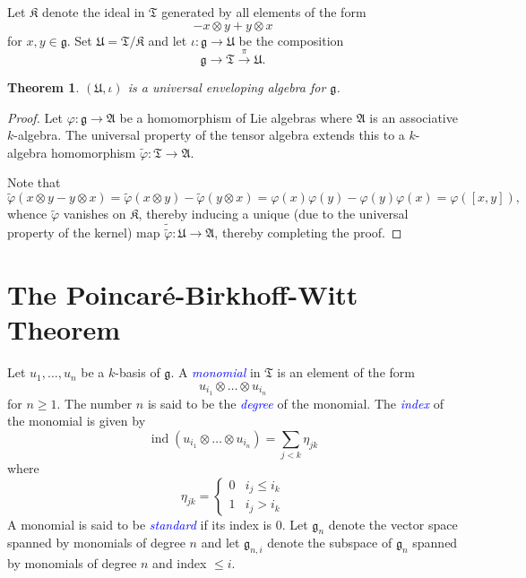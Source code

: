 \documentclass[12pt]{article}
\theoremstyle{thmstyle}
\newtheorem{theorem}{Theorem}[section]
\theoremstyle{defstyle}
\newcommand{\frakT}{\mathfrak{T}}
\newcommand{\frakg}{\mathfrak{g}}
\newcommand{\frakA}{\mathfrak{A}}
\newcommand{\frakK}{\mathfrak{K}}
\newcommand{\frakU}{\mathfrak{U}}
\newcommand{\wt}[1]{\widetilde{#1}}
\newcommand{\define}[1]{\textcolor{blue}{\textit{#1}}}
\renewcommand{\le}{\leqslant}
\renewcommand{\ge}{\geqslant}
\newcommand{\ind}{\operatorname{ind}}
\begin{document}
Let $\frakK$ denote the ideal in $\frakT$ generated by all elements of the form 
\begin{equation*}
    [x, y] - x\otimes y + y\otimes x
\end{equation*}
for $x,y\in\frakg$. Set $\frakU = \frakT/\frakK$ and let $\iota: \frakg\to\frakU$ be the composition
\begin{equation*}
    \frakg\longrightarrow\frakT\stackrel{\pi}{\longrightarrow}\frakU.
\end{equation*}

\begin{theorem}
    $(\frakU, \iota)$ is a universal enveloping algebra for $\frakg$.
\end{theorem}
\begin{proof}
    Let $\varphi:\frakg\to\frakA$ be a homomorphism of Lie algebras where $\frakA$ is an associative $k$-algebra. The universal property of the tensor algebra extends this to a $k$-algebra homomorphism $\wt\varphi:\frakT\to\frakA$. 

    Note that 
    \begin{equation*}
        \wt\varphi(x\otimes y - y\otimes x) = \wt\varphi(x\otimes y) - \wt\varphi(y\otimes x) = \varphi(x)\varphi(y) - \varphi(y)\varphi(x) = \varphi([x, y]),
    \end{equation*}
    whence $\wt\varphi$ vanishes on $\frakK$, thereby inducing a unique (due to the universal property of the kernel) map $\wt{\wt\varphi}:\frakU\to\frakA$, thereby completing the proof.
\end{proof}


\section{The Poincar\'e-Birkhoff-Witt Theorem}

Let $u_1,\dots,u_n$ be a $k$-basis of $\frakg$. A \define{monomial} in $\frakT$ is an element of the form 
\begin{equation*}
    u_{i_1}\otimes\dots\otimes u_{i_n}
\end{equation*}
for $n\ge 1$. The number $n$ is said to be the \define{degree} of the monomial. The \define{index} of the monomial is given by 
\begin{equation*}
    \ind(u_{i_1}\otimes\dots\otimes u_{i_n}) = \sum_{j < k}\eta_{jk}
\end{equation*}
where 
\begin{equation*}
    \eta_{jk} = 
    \begin{cases}
        0 & i_j \le i_k\\
        1 & i_j > i_k
    \end{cases}
\end{equation*}
A monomial is said to be \define{standard} if its index is $0$. Let $\frakg_n$ denote the vector space spanned by monomials of degree $n$ and let $\frakg_{n, i}$ denote the subspace of $\frakg_n$ spanned by monomials of degree $n$ and index $\le i$.
\end{document}
